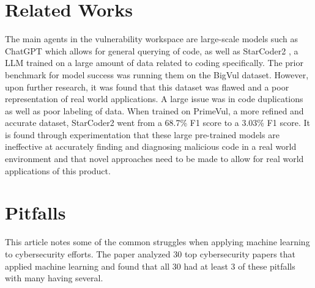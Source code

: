 \documentclass{article}
\begin{document}
\section{Related Works}
The main agents in the vulnerability workspace are large-scale models such as ChatGPT \cite{} which allows for general querying of code, as well as StarCoder2 \cite{}, a LLM trained on a large amount of data related to coding specifically. The prior benchmark for model success was running them on the BigVul dataset. However, upon further research, it was found that this dataset was flawed and a poor representation of real world applications. A large issue was in code duplications as well as poor labeling of data. When trained on PrimeVul, a more refined and accurate dataset, StarCoder2 went from a 68.7\% F1 score to a 3.03\% F1 score. It is found through experimentation that these large pre-trained models are ineffective at accurately finding and diagnosing malicious code in a real world environment and that novel approaches need to be made to allow for real world applications of this product. \cite{}

\section{Pitfalls}

This article notes some of the common struggles when applying machine learning to cybersecurity efforts. The paper analyzed 30 top cybersecurity papers that applied machine learning and found that all 30 had at least 3 of these pitfalls with many having several.
\end{document}
